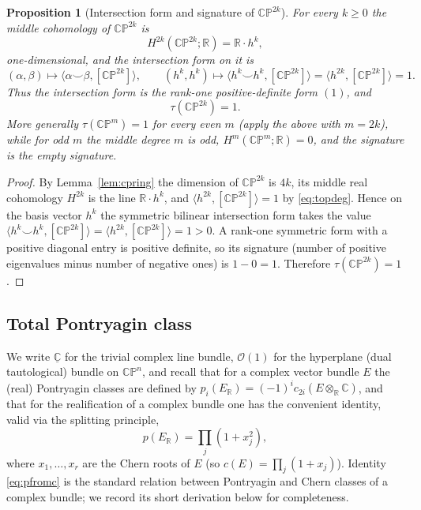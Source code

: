 \documentclass[12pt]{article}
\newtheorem{proposition}{Proposition}
\theoremstyle{definition}
\begin{document}
\begin{proposition}[Intersection form and signature of $\mathbb{CP}^{2k}$]\label{prop:sig}
For every $k\ge 0$ the middle cohomology of $\mathbb{CP}^{2k}$ is
\[
H^{2k}(\mathbb{CP}^{2k};\mathbb{R})=\mathbb{R}\cdot h^{k},
\]
one-dimensional, and the intersection form on it is
\[
(\alpha,\beta)\longmapsto\langle\alpha\smile\beta,[\mathbb{CP}^{2k}]\rangle,
\qquad
(h^k,h^k)\longmapsto\big\langle h^{k}\smile h^{k},[\mathbb{CP}^{2k}]\big\rangle
=\big\langle h^{2k},[\mathbb{CP}^{2k}]\big\rangle=1.
\]
Thus the intersection form is the rank-one positive-definite form $(1)$, and
\[
\tau(\mathbb{CP}^{2k})=1.
\]
More generally $\tau(\mathbb{CP}^m)=1$ for every even $m$ (apply the above with
$m=2k$), while for odd $m$ the middle degree $m$ is odd, $H^m(\mathbb{CP}^m;\mathbb{R})=0$,
and the signature is the empty signature.
\end{proposition}

\begin{proof}
By Lemma~\ref{lem:cpring} the dimension of $\mathbb{CP}^{2k}$ is $4k$, its middle real
cohomology $H^{2k}$ is the line $\mathbb{R}\cdot h^k$, and
$\langle h^{2k},[\mathbb{CP}^{2k}]\rangle=1$ by \eqref{eq:topdeg}.  Hence on the basis
vector $h^k$ the symmetric bilinear intersection form takes the value
$\langle h^k\smile h^k,[\mathbb{CP}^{2k}]\rangle=\langle h^{2k},[\mathbb{CP}^{2k}]\rangle
=1>0$.  A rank-one symmetric form with a positive diagonal entry is positive definite, so
its signature (number of positive eigenvalues minus number of negative ones) is
$1-0=1$.  Therefore $\tau(\mathbb{CP}^{2k})=1$.
\end{proof}

\subsection*{Total Pontryagin class}

We write $\underline{\mathbb{C}}$ for the trivial complex line bundle, $\mathcal{O}(1)$
for the hyperplane (dual tautological) bundle on $\mathbb{CP}^n$, and recall that for a
complex vector bundle $E$ the (real) Pontryagin classes are defined by
$p_i(E_{\mathbb{R}})=(-1)^i c_{2i}(E\otimes_{\mathbb{R}}\mathbb{C})$, and that for the
realification of a complex bundle one has the convenient identity, valid via the
splitting principle,
\[
p(E_{\mathbb{R}})=\prod_j (1+x_j^2),
\tag{$\dagger$}\label{eq:pfromc}
\]
where $x_1,\dots,x_r$ are the Chern roots of $E$ (so $c(E)=\prod_j(1+x_j)$).  Identity
\eqref{eq:pfromc} is the standard relation between Pontryagin and Chern classes of a
complex bundle; we record its short derivation below for completeness.
\end{document}
